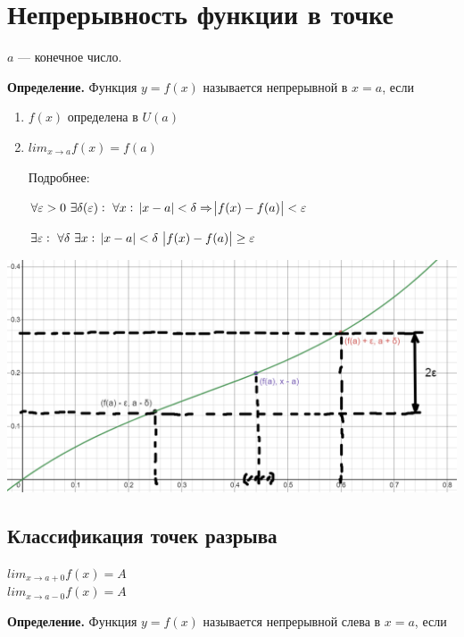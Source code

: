 \documentclass{article}
\begin{document}
    \section{Непрерывность функции в точке}

    \(a\) --- конечное число.

    \textbf{Определение.} Функция \(y = f(x)\) называется непрерывной в \(x = a\), если 

    \begin{enumerate}
        \item \(f(x)\) определена в \(U(a)\)
        \item \(lim_{x \rightarrow a} f(x) = f(a)\)
        
        Подробнее:

        \( \forall \varepsilon > 0\ \exists \delta(\varepsilon):\ \forall x:\ \abs{x - a} < \delta \Rightarrow \abs{f(x) - f(a)} < \varepsilon \)

        \(\exists \varepsilon:\ \forall \delta\ \exists x:\ \abs{x-a}<\delta\ \abs{f(x)-f(a)} \geq \varepsilon\)
    \end{enumerate}

    \begin{minipage}{0.49\linewidth}
        \includegraphics[scale=0.32]{11_1_3_1.png}
    \end{minipage}

    \subsection{Классификация точек разрыва}
    \(lim_{x \rightarrow a + 0} f(x) = A\)\\
    \(lim_{x \rightarrow a - 0} f(x) = A\)
    
    \textbf{Определение.} Функция \(y = f(x)\) называется непрерывной слева в \(x = a\), если
\end{document}
